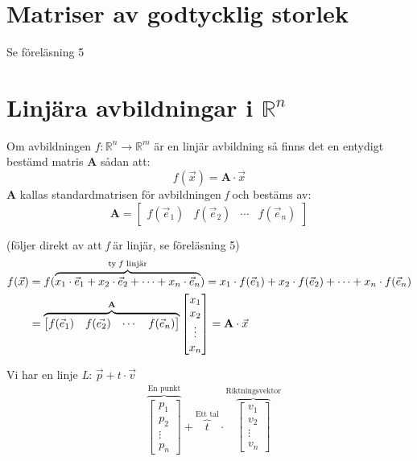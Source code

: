 \section{Matriser av godtycklig storlek} %
\label{sec:matriser_av_godtycklig_storlek}
Se föreläsning 5

\section{Linjära avbildningar i $\mathbb{R}^n$} %
\label{sec:linj_ra_avbildningar_i_}
Om avbildningen $f:\mathbb{R}^n \rightarrow \mathbb{R}^m$ är en linjär avbildning så finns det en entydigt bestämd matris \textbf{A} sådan att:
\[
    f(\vec{x}) = \mathbf{A} \cdot \vec{x}
\]
\textbf{A} kallas standardmatrisen för avbildningen \textit{f} och bestäms av:
\[
    \mathbf{A} = \begin{bmatrix} f(\vec{e}_1)&f(\vec{e}_2)&\cdots&f(\vec{e}_n) \end{bmatrix}
\]
\begin{bevis}
	(följer direkt av att \textit{f} är linjär, se föreläsning 5)
	\begin{align*}
	f(\vec{x}) &= f(\overbrace{x_1 \cdot \vec{e}_1 + x_2 \cdot \vec{e}_2 + \cdots + x_n \cdot \vec{e}_n}^\text{ty \textit{f} linjär}) = x_1 \cdot f(\vec{e}_1) + x_2 \cdot f(\vec{e}_2) + \cdots + x_n \cdot f(\vec{e}_n) \\
	&= \overbrace{\begin{bmatrix} f(\vec{e}_1)&f(\vec{e_2})&\cdots&f(\vec{e}_n) \end{bmatrix}}^\text{\textbf{A}} \begin{bmatrix} x_1\\x_2\\\vdots\\x_n \end{bmatrix} = \mathbf{A} \cdot \vec{x}
	\end{align*}
	
\end{bevis}
Vi har en linje \textit{L}: $\vec{p} + t \cdot \vec{v}$
\begin{align*}
&\overbrace{\begin{bmatrix} p_1\\p_2\\\vdots\\p_n \end{bmatrix}}^\text{En punkt} + \overbrace{t}^\text{Ett tal} \cdot \overbrace{\begin{bmatrix} v_1\\v_2\\\vdots\\v_n \end{bmatrix}}^\text{Riktningsvektor}
\\
\end{align*}
